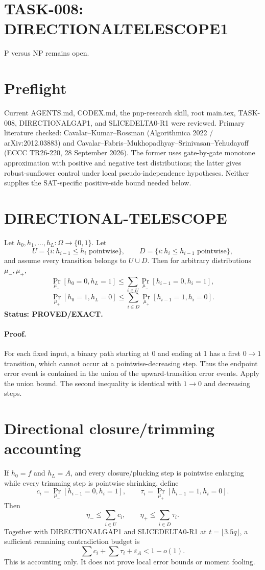 \documentclass{article}
\begin{document}
\section*{TASK-008: DIRECTIONALTELESCOPE1}
P versus NP remains open.

\section*{Preflight}
Current AGENTS.md, CODEX.md, the pnp-research skill, root main.tex, TASK-008, DIRECTIONALGAP1, and SLICEDELTA0-R1 were reviewed. Primary literature checked: Cavalar--Kumar--Rossman (Algorithmica 2022 / arXiv:2012.03883) and Cavalar--Fabris--Mukhopadhyay--Srinivasan--Yehudayoff (ECCC TR26-220, 28 September 2026). The former uses gate-by-gate monotone approximation with positive and negative test distributions; the latter gives robust-sunflower control under local pseudo-independence hypotheses. Neither supplies the SAT-specific positive-side bound needed below.

\section*{DIRECTIONAL-TELESCOPE}
Let $h_0,h_1,\ldots,h_L:\Omega\to\{0,1\}$. Let
\[
U=\{i:h_{i-1}\le h_i\text{ pointwise}\},\qquad
D=\{i:h_i\le h_{i-1}\text{ pointwise}\},
\]
and assume every transition belongs to $U\cup D$. Then for arbitrary distributions $\mu_-,\mu_+$,
\[
\boxed{\Pr_{\mu_-}[h_0=0,h_L=1]
\le \sum_{i\in U}\Pr_{\mu_-}[h_{i-1}=0,h_i=1],}
\]
\[
\boxed{\Pr_{\mu_+}[h_0=1,h_L=0]
\le \sum_{i\in D}\Pr_{\mu_+}[h_{i-1}=1,h_i=0].}
\]
\textbf{Status: PROVED/EXACT.}

\paragraph{Proof.}
For each fixed input, a binary path starting at 0 and ending at 1 has a first $0\to1$ transition, which cannot occur at a pointwise-decreasing step. Thus the endpoint error event is contained in the union of the upward-transition error events. Apply the union bound. The second inequality is identical with $1\to0$ and decreasing steps.

\section*{Directional closure/trimming accounting}
If $h_0=f$ and $h_L=A$, and every closure/plucking step is pointwise enlarging while every trimming step is pointwise shrinking, define
\[
c_i=\Pr_{\mu_-}[h_{i-1}=0,h_i=1],\qquad
\tau_i=\Pr_{\mu_+}[h_{i-1}=1,h_i=0].
\]
Then
\[
\boxed{\eta_-\le\sum_{i\in U}c_i,\qquad
\eta_+\le\sum_{i\in D}\tau_i.}
\]
Together with DIRECTIONALGAP1 and SLICEDELTA0-R1 at $t=\lfloor3.5q\rfloor$, a sufficient remaining contradiction budget is
\[
\boxed{\sum c_i+\sum \tau_i+\varepsilon_A<1-o(1).}
\]
This is accounting only. It does not prove local error bounds or moment fooling.
\end{document}
